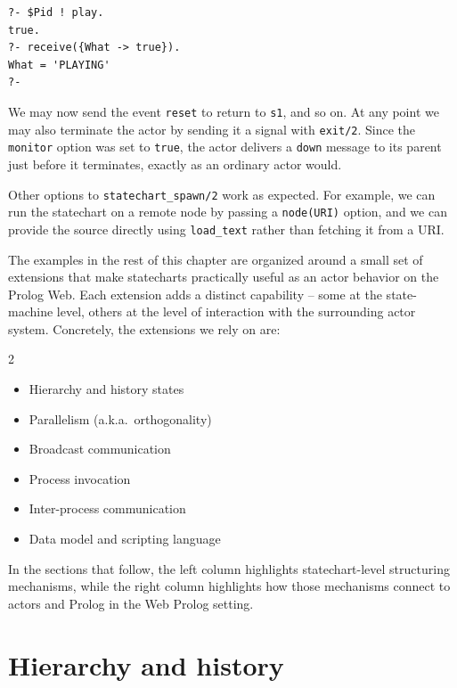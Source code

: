\begin{verbatim}
?- $Pid ! play.
true.
?- receive({What -> true}).
What = 'PLAYING'
?-
\end{verbatim}

\noindent We may now send the event \texttt{reset} to return to \texttt{s1}, and so on. At any point we may also terminate the actor by sending it a signal with \texttt{exit/2}. Since the \texttt{monitor} option was set to \texttt{true}, the actor delivers a \texttt{down} message to its parent just before it terminates, exactly as an ordinary actor would.

Other options to \texttt{statechart\_spawn/2} work as expected. For example, we can run the statechart on a remote node by passing a \texttt{node(URI)} option, and we can provide the source directly using \texttt{load\_text} rather than fetching it from a URI.

The examples in the rest of this chapter are organized around a small set of extensions that make statecharts practically useful as an actor behavior on the Prolog Web. Each extension adds a distinct capability -- some at the state-machine level, others at the level of interaction with the surrounding actor system. Concretely, the extensions we rely on are:

\medskip

\noindent\begin{minipage}{11.5cm}
\begin{multicols}{2}
\begin{itemize}
\item Hierarchy and history states
\item Parallelism (a.k.a.\ orthogonality)
\item Broadcast communication
\item Process invocation
\item Inter-process communication
\item Data model and scripting language
\end{itemize}
\end{multicols}
\end{minipage}

\vspace{0.5cm}
\noindent In the sections that follow, the left column highlights statechart-level structuring mechanisms, while the right column highlights how those mechanisms connect to actors and Prolog in the Web Prolog setting.




\section{Hierarchy and history}
\label{sec:hierarchy-history}

